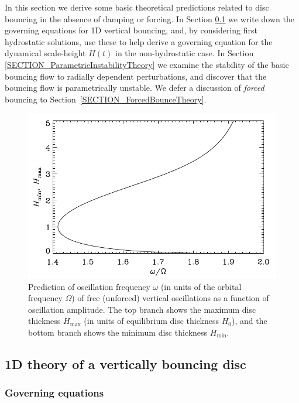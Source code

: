 \documentclass[fleqn,usenatbib]{mnras}
\begin{document}
In this section we derive some basic theoretical predictions related to disc bouncing in the absence of damping or forcing. In Section \ref{SECTION_1DTheoryofVerticallyBouncingdisc} we write down the governing equations for 1D vertical bouncing, and, by considering first hydrostatic solutions, use these to help derive a governing equation for the %
dynamical scale-height $H(t)$ in the non-hydrostatic case. In Section \ref{SECTION_ParametricInstabilityTheory} we examine the stability of the basic bouncing flow to radially dependent perturbations, and discover that the bouncing flow is parametrically unstable. We defer a discussion of \textit{forced} bouncing to Section~\ref{SECTION_ForcedBounceTheory}.


\begin{figure}
\centering
\includegraphics[scale=0.7]{Figures/h_omega_MinMaxScaleheightAsFunctionofBounceFrequencyForFreeBounce.pdf}
\caption{Prediction of oscillation frequency $\omega$ (in units of the orbital frequency $\Omega$) of free (unforced) vertical oscillations as a function of oscillation amplitude. The top branch shows the maximum disc thickness $H_{\text{max}}$ (in units of equilibrium disc thickness $H_0$), and the bottom branch shows the minimum disc thickness $H_{\text{min}}$.}
\label{FIGURE_FreeBounceHmaxHminPrediction}
\end{figure}

\subsection{1D theory of a vertically bouncing disc}
\label{SECTION_1DTheoryofVerticallyBouncingdisc}
\subsubsection{Governing equations}
\end{document}
